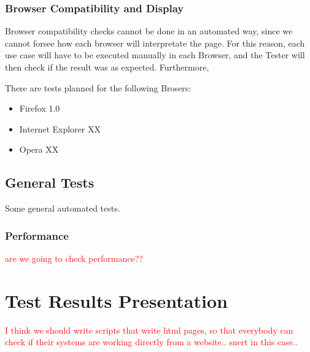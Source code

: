 \documentclass[11pt]{article}
\begin{document}
\subsubsection*{Browser Compatibility and Display}

\indent

Browser compatibility checks cannot be done in an automated way, since we cannot forsee how each browser will interpretate the page. For this reason, each use case will have to be executed manually in each Browser, and the Tester will then check if the result was as expected. Furthermore, 

There are tests planned for the following Brosers:

\begin{itemize}

\item Firefox 1.0
\item Internet Explorer XX
\item Opera XX

\end{itemize}

\subsection{General Tests}

\indent 

Some general automated tests.

\subsubsection*{Performance}

\indent

\textcolor{red}{are we going to check performance??}


\section{Test Results Presentation}

\indent

\textcolor{red}{I think we should write scripts that write html pages,
so that everybody can check if their systems are working directly from
a website.. snert in this case..}
\end{document}
